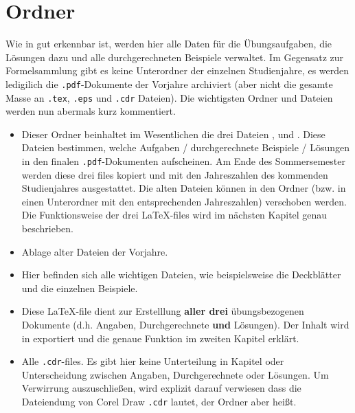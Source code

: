 \section{Ordner }

Wie in  gut erkennbar ist, werden hier alle Daten für
die Übungsaufgaben, die Lösungen dazu und alle durchgerechneten Beispiele
verwaltet. Im Gegensatz zur Formelsammlung gibt es keine Unterordner der
einzelnen Studienjahre, es werden ledigilich die {\tt .pdf}-Dokumente der 
Vorjahre archiviert (aber nicht die gesamte Masse an {\tt .tex}, {\tt .eps} und 
{\tt .cdr} Dateien). Die wichtigsten Ordner und Dateien werden nun abermals kurz
kommentiert.

\begin{itemize}
  \item {} Dieser Ordner beinhaltet im
    Wesentlichen die drei Dateien ,
     und 
    . Diese Dateien bestimmen, welche
    Aufgaben / durchgerechnete Beispiele / Lösungen in den finalen
    {\tt .pdf}-Dokumenten aufscheinen. Am Ende des Sommersemester werden diese
    drei files kopiert und mit den Jahreszahlen des kommenden Studienjahres
    ausgestattet. Die alten Dateien können in den Ordner
     (bzw. in einen Unterordner mit den
    entsprechenden Jahreszahlen) verschoben werden. Die Funktionsweise der drei
    \LaTeX-files wird im nächsten Kapitel genau beschrieben.
  \item {} Ablage alter Dateien der Vorjahre.
  \item {} Hier befinden sich alle wichtigen Dateien, wie
    beispielsweise die Deckblätter und die einzelnen Beispiele.
  \item {} Diese \LaTeX-file dient zur Erstelllung
    {\bf aller drei} übungsbezogenen Dokumente (d.h. Angaben, Durchgerechnete
    {\bf und} Lösungen). Der Inhalt wird in  exportiert
    und die genaue Funktion im zweiten Kapitel erklärt.
  \item {} Alle {\tt .cdr}-files. Es gibt hier keine
    Unterteilung in Kapitel oder Unterscheidung zwischen Angaben,
    Durchgerechnete oder Lösungen. Um Verwirrung auszuschließen, wird explizit
    darauf verwiesen dass die Dateiendung von Corel Draw {\tt .cdr} lautet, der
    Ordner aber  heißt.

\end{itemize}
